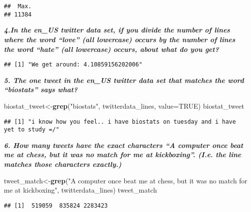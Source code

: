 \documentclass[
]{article}
\newenvironment{Shaded}{\begin{snugshade}}{\end{snugshade}}
\newcommand{\DataTypeTok}[1]{\textcolor[rgb]{0.13,0.29,0.53}{#1}}
\newcommand{\KeywordTok}[1]{\textcolor[rgb]{0.13,0.29,0.53}{\textbf{#1}}}
\newcommand{\NormalTok}[1]{#1}
\newcommand{\OperatorTok}[1]{\textcolor[rgb]{0.81,0.36,0.00}{\textbf{#1}}}
\newcommand{\OtherTok}[1]{\textcolor[rgb]{0.56,0.35,0.01}{#1}}
\newcommand{\StringTok}[1]{\textcolor[rgb]{0.31,0.60,0.02}{#1}}
\begin{document}
\begin{verbatim}
##  Max. 
## 11384
\end{verbatim}

\textbf{\emph{4.In the en\_US twitter data set, if you divide the number
of lines where the word ``love'' (all lowercase) occurs by the number of
lines the word ``hate'' (all lowercase) occurs, about what do you get?}}

\begin{Shaded}
\end{Shaded}

\begin{verbatim}
## [1] "We get around: 4.10859156202006"
\end{verbatim}

\textbf{\emph{5. The one tweet in the en\_US twitter data set that
matches the word ``biostats'' says what?}}

\begin{Shaded}
\begin{Highlighting}[]
\NormalTok{biostat_tweet<-}\KeywordTok{grep}\NormalTok{(}\StringTok{"biostats"}\NormalTok{, twitterdata_lines, }\DataTypeTok{value=}\OtherTok{TRUE}\NormalTok{)}
\NormalTok{biostat_tweet}
\end{Highlighting}
\end{Shaded}

\begin{verbatim}
## [1] "i know how you feel.. i have biostats on tuesday and i have yet to study =/"
\end{verbatim}

\textbf{\emph{6. How many tweets have the exact characters ``A computer
once beat me at chess, but it was no match for me at kickboxing''. (I.e.
the line matches those characters exactly.)}}

\begin{Shaded}
\begin{Highlighting}[]
\NormalTok{tweet_match<-}\KeywordTok{grep}\NormalTok{(}\StringTok{"A computer once beat me at chess, but it was no match for me at kickboxing"}\NormalTok{, twitterdata_lines)}
\NormalTok{tweet_match}
\end{Highlighting}
\end{Shaded}

\begin{verbatim}
## [1]  519059  835824 2283423
\end{verbatim}
\end{document}
